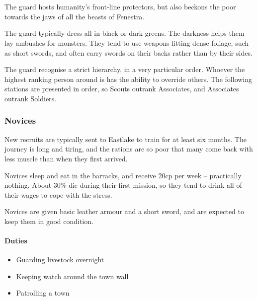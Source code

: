 \chapter{}

\label{guard}

\begin{multicols}{2}

\noindent
The \Gls{guard} hosts humanity's front-line protectors, but also beckons the poor towards the jaws of all the beasts of Fenestra.

The \Gls{guard} typically dress all in black or dark greens.
The darkness helps them lay ambushes for monsters.
They tend to use weapons fitting dense foliage, such as short swords, and often carry swords on their backs rather than by their sides.

The \Gls{guard} recognise a strict hierarchy, in a very particular order.
Whoever the highest ranking person around is has the ability to override others.
The following stations are presented in order, so Scouts outrank Associates, and Associates outrank Soldiers.

\subsection{Novices}

New recruits are typically sent to Eastlake to train for at least six months.
The journey is long and tiring, and the rations are so poor that many come back with less muscle than when they first arrived.

Novices sleep and eat in the barracks, and receive 20cp per week -- practically nothing.
About 30\% die during their first mission, so they tend to drink all of their wages to cope with the stress.

Novices are given basic leather armour and a short sword, and are expected to keep them in good condition.

\subsubsection{Duties}

\begin{itemize}

  \item{Guarding livestock overnight}
  \item{Keeping watch around the town wall}
  \item{Patrolling a town}
\end{itemize}


\end{multicols}
